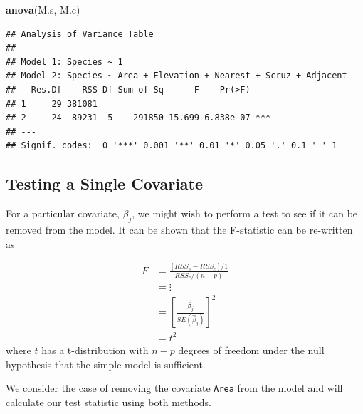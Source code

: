 \documentclass[]{book}
\newenvironment{Shaded}{\begin{snugshade}}{\end{snugshade}}
\newcommand{\KeywordTok}[1]{\textcolor[rgb]{0.13,0.29,0.53}{\textbf{{#1}}}}
\newcommand{\NormalTok}[1]{{#1}}
\theoremstyle{definition}
\theoremstyle{definition}
\theoremstyle{remark}
\begin{document}
\begin{Shaded}
\begin{Highlighting}[]
\KeywordTok{anova}\NormalTok{(M.s, M.c)}
\end{Highlighting}
\end{Shaded}

\begin{verbatim}
## Analysis of Variance Table
## 
## Model 1: Species ~ 1
## Model 2: Species ~ Area + Elevation + Nearest + Scruz + Adjacent
##   Res.Df    RSS Df Sum of Sq      F    Pr(>F)    
## 1     29 381081                                  
## 2     24  89231  5    291850 15.699 6.838e-07 ***
## ---
## Signif. codes:  0 '***' 0.001 '**' 0.01 '*' 0.05 '.' 0.1 ' ' 1
\end{verbatim}

\subsection{Testing a Single
Covariate}\label{testing-a-single-covariate}

For a particular covariate, \(\beta_{j}\), we might wish to perform a
test to see if it can be removed from the model. It can be shown that
the F-statistic can be re-written as

\[\begin{aligned}
F   &=  \frac{\left[RSS_{s}-RSS_{c}\right]/1}{RSS_{c}/\left(n-p\right)}\\
    &=  \vdots\\
    &=  \left[\frac{\hat{\beta_{j}}}{SE\left(\hat{\beta}_{j}\right)}\right]^{2}\\
    &= t^{2}
\end{aligned}\] where \(t\) has a t-distribution with \(n-p\) degrees of
freedom under the null hypothesis that the simple model is sufficient.

We consider the case of removing the covariate \texttt{Area} from the
model and will calculate our test statistic using both methods.
\end{document}
